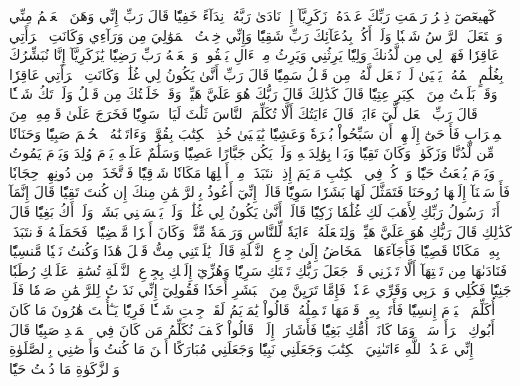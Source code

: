 كٓهيعٓصٓ
ذِكۡرُ رَحۡمَتِ رَبِّكَ عَبۡدَهُۥ زَكَرِيَّآ
إِذۡ نَادَىٰ رَبَّهُۥ نِدَآءً خَفِيّٗا
قَالَ رَبِّ إِنِّي وَهَنَ ٱلۡعَظۡمُ مِنِّي وَٱشۡتَعَلَ ٱلرَّأۡسُ شَيۡبٗا وَلَمۡ أَكُنۢ بِدُعَآئِكَ رَبِّ شَقِيّٗا
وَإِنِّي خِفۡتُ ٱلۡمَوَٰلِيَ مِن وَرَآءِي وَكَانَتِ ٱمۡرَأَتِي عَاقِرٗا فَهَبۡ لِي مِن لَّدُنكَ وَلِيّٗا
يَرِثُنِي وَيَرِثُ مِنۡ ءَالِ يَعۡقُوبَۖ وَٱجۡعَلۡهُ رَبِّ رَضِيّٗا
يَٰزَكَرِيَّآ إِنَّا نُبَشِّرُكَ بِغُلَٰمٍ ٱسۡمُهُۥ يَحۡيَىٰ لَمۡ نَجۡعَل لَّهُۥ مِن قَبۡلُ سَمِيّٗا
قَالَ رَبِّ أَنَّىٰ يَكُونُ لِي غُلَٰمٞ وَكَانَتِ ٱمۡرَأَتِي عَاقِرٗا وَقَدۡ بَلَغۡتُ مِنَ ٱلۡكِبَرِ عِتِيّٗا
قَالَ كَذَٰلِكَ قَالَ رَبُّكَ هُوَ عَلَيَّ هَيِّنٞ وَقَدۡ خَلَقۡتُكَ مِن قَبۡلُ وَلَمۡ تَكُ شَيۡـٔٗا
قَالَ رَبِّ ٱجۡعَل لِّيٓ ءَايَةٗۖ قَالَ ءَايَتُكَ أَلَّا تُكَلِّمَ ٱلنَّاسَ ثَلَٰثَ لَيَالٖ سَوِيّٗا
فَخَرَجَ عَلَىٰ قَوۡمِهِۦ مِنَ ٱلۡمِحۡرَابِ فَأَوۡحَىٰٓ إِلَيۡهِمۡ أَن سَبِّحُواْ بُكۡرَةٗ وَعَشِيّٗا
يَٰيَحۡيَىٰ خُذِ ٱلۡكِتَٰبَ بِقُوَّةٖۖ وَءَاتَيۡنَٰهُ ٱلۡحُكۡمَ صَبِيّٗا
وَحَنَانٗا مِّن لَّدُنَّا وَزَكَوٰةٗۖ وَكَانَ تَقِيّٗا
وَبَرَّۢا بِوَٰلِدَيۡهِ وَلَمۡ يَكُن جَبَّارًا عَصِيّٗا
وَسَلَٰمٌ عَلَيۡهِ يَوۡمَ وُلِدَ وَيَوۡمَ يَمُوتُ وَيَوۡمَ يُبۡعَثُ حَيّٗا
وَٱذۡكُرۡ فِي ٱلۡكِتَٰبِ مَرۡيَمَ إِذِ ٱنتَبَذَتۡ مِنۡ أَهۡلِهَا مَكَانٗا شَرۡقِيّٗا
فَٱتَّخَذَتۡ مِن دُونِهِمۡ حِجَابٗا فَأَرۡسَلۡنَآ إِلَيۡهَا رُوحَنَا فَتَمَثَّلَ لَهَا بَشَرٗا سَوِيّٗا
قَالَتۡ إِنِّيٓ أَعُوذُ بِٱلرَّحۡمَٰنِ مِنكَ إِن كُنتَ تَقِيّٗا
قَالَ إِنَّمَآ أَنَا۠ رَسُولُ رَبِّكِ لِأَهَبَ لَكِ غُلَٰمٗا زَكِيّٗا
قَالَتۡ أَنَّىٰ يَكُونُ لِي غُلَٰمٞ وَلَمۡ يَمۡسَسۡنِي بَشَرٞ وَلَمۡ أَكُ بَغِيّٗا
قَالَ كَذَٰلِكِ قَالَ رَبُّكِ هُوَ عَلَيَّ هَيِّنٞۖ وَلِنَجۡعَلَهُۥٓ ءَايَةٗ لِّلنَّاسِ وَرَحۡمَةٗ مِّنَّاۚ وَكَانَ أَمۡرٗا مَّقۡضِيّٗا
۞فَحَمَلَتۡهُ فَٱنتَبَذَتۡ بِهِۦ مَكَانٗا قَصِيّٗا
فَأَجَآءَهَا ٱلۡمَخَاضُ إِلَىٰ جِذۡعِ ٱلنَّخۡلَةِ قَالَتۡ يَٰلَيۡتَنِي مِتُّ قَبۡلَ هَٰذَا وَكُنتُ نَسۡيٗا مَّنسِيّٗا
فَنَادَىٰهَا مِن تَحۡتِهَآ أَلَّا تَحۡزَنِي قَدۡ جَعَلَ رَبُّكِ تَحۡتَكِ سَرِيّٗا
وَهُزِّيٓ إِلَيۡكِ بِجِذۡعِ ٱلنَّخۡلَةِ تُسَٰقِطۡ عَلَيۡكِ رُطَبٗا جَنِيّٗا
فَكُلِي وَٱشۡرَبِي وَقَرِّي عَيۡنٗاۖ فَإِمَّا تَرَيِنَّ مِنَ ٱلۡبَشَرِ أَحَدٗا فَقُولِيٓ إِنِّي نَذَرۡتُ لِلرَّحۡمَٰنِ صَوۡمٗا فَلَنۡ أُكَلِّمَ ٱلۡيَوۡمَ إِنسِيّٗا
فَأَتَتۡ بِهِۦ قَوۡمَهَا تَحۡمِلُهُۥۖ قَالُواْ يَٰمَرۡيَمُ لَقَدۡ جِئۡتِ شَيۡـٔٗا فَرِيّٗا
يَـٰٓأُخۡتَ هَٰرُونَ مَا كَانَ أَبُوكِ ٱمۡرَأَ سَوۡءٖ وَمَا كَانَتۡ أُمُّكِ بَغِيّٗا
فَأَشَارَتۡ إِلَيۡهِۖ قَالُواْ كَيۡفَ نُكَلِّمُ مَن كَانَ فِي ٱلۡمَهۡدِ صَبِيّٗا
قَالَ إِنِّي عَبۡدُ ٱللَّهِ ءَاتَىٰنِيَ ٱلۡكِتَٰبَ وَجَعَلَنِي نَبِيّٗا
وَجَعَلَنِي مُبَارَكًا أَيۡنَ مَا كُنتُ وَأَوۡصَٰنِي بِٱلصَّلَوٰةِ وَٱلزَّكَوٰةِ مَا دُمۡتُ حَيّٗا

